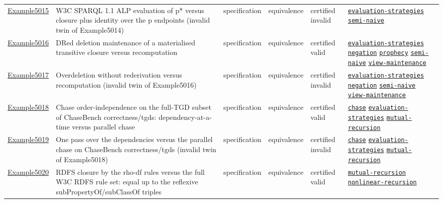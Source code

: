 \documentclass[10pt]{article}
\begin{document}
\begin{longtable}{@{}lp{}p{}p{}p{}p{}@{}}
\hyperref[case:Example5015]{Example5015} & W3C SPARQL 1.1 ALP evaluation of p* versus closure plus identity over the p endpoints (invalid twin of Example5014) & specification & equivalence & certified invalid & {\scriptsize \hyperref[tag:evaluation-strategies]{\texttt{evaluation-strategies}} \hyperref[tag:semi-naive]{\texttt{semi-naive}}} \\
\hyperref[case:Example5016]{Example5016} & DRed deletion maintenance of a materialised transitive closure versus recomputation & specification & equivalence & certified valid & {\scriptsize \hyperref[tag:evaluation-strategies]{\texttt{evaluation-strategies}} \hyperref[tag:negation]{\texttt{negation}} \hyperref[tag:prophecy]{\texttt{prophecy}} \hyperref[tag:semi-naive]{\texttt{semi-naive}} \hyperref[tag:view-maintenance]{\texttt{view-maintenance}}} \\
\hyperref[case:Example5017]{Example5017} & Overdeletion without rederivation versus recomputation (invalid twin of Example5016) & specification & equivalence & certified invalid & {\scriptsize \hyperref[tag:evaluation-strategies]{\texttt{evaluation-strategies}} \hyperref[tag:negation]{\texttt{negation}} \hyperref[tag:semi-naive]{\texttt{semi-naive}} \hyperref[tag:view-maintenance]{\texttt{view-maintenance}}} \\
\hyperref[case:Example5018]{Example5018} & Chase order-independence on the full-TGD subset of ChaseBench correctness/tgds: dependency-at-a-time versus parallel chase & specification & equivalence & certified valid & {\scriptsize \hyperref[tag:chase]{\texttt{chase}} \hyperref[tag:evaluation-strategies]{\texttt{evaluation-strategies}} \hyperref[tag:mutual-recursion]{\texttt{mutual-recursion}}} \\
\hyperref[case:Example5019]{Example5019} & One pass over the dependencies versus the parallel chase on ChaseBench correctness/tgds (invalid twin of Example5018) & specification & equivalence & certified invalid & {\scriptsize \hyperref[tag:chase]{\texttt{chase}} \hyperref[tag:evaluation-strategies]{\texttt{evaluation-strategies}} \hyperref[tag:mutual-recursion]{\texttt{mutual-recursion}}} \\
\hyperref[case:Example5020]{Example5020} & RDFS closure by the rho-df rules versus the full W3C RDFS rule set: equal up to the reflexive subPropertyOf/subClassOf triples & specification & equivalence & certified valid & {\scriptsize \hyperref[tag:mutual-recursion]{\texttt{mutual-recursion}} \hyperref[tag:nonlinear-recursion]{\texttt{nonlinear-recursion}}} \\

\end{longtable}
\end{document}
